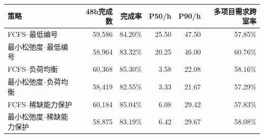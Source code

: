 \begin{tabular}{lrrrrr}
\toprule
策略 & 48h完成数 & 完成率 & P50/h & P90/h & 多项目需求跨室率 \\
\midrule
FCFS--最低编号 & 59,586 & 84.20\% & 25.50 & 47.50 & 57.85\% \\
最小松弛度--最低编号 & 58,964 & 83.32\% & 20.25 & 46.00 & 60.76\% \\
FCFS--负荷均衡 & 60,368 & 85.30\% & 3.58 & 22.08 & 58.16\% \\
最小松弛度--负荷均衡 & 58,419 & 82.55\% & 3.33 & 21.67 & 57.29\% \\
FCFS--稀缺能力保护 & 60,184 & 85.04\% & 6.08 & 29.42 & 57.83\% \\
最小松弛度--稀缺能力保护 & 58,875 & 83.19\% & 6.42 & 29.67 & 58.08\% \\
\bottomrule
\end{tabular}

